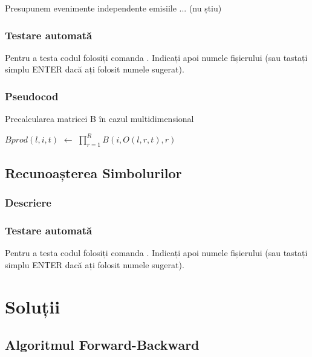 \documentclass[12pt]{article}
\begin{document}
Presupunem evenimente independente emisiile ... (nu știu)

\subsubsection{Testare automată}

Pentru a testa codul folosiți comanda
.  Indicați apoi numele
fișierului (sau tastați simplu ENTER dacă ați folosit numele sugerat).

\subsubsection{Pseudocod}

\begin{algorithm}[H]
  \caption{Precalcularea matricei B în cazul multidimensional}
  \label{alg:alexinmultestematrici}
  \begin{algorithmic}[2]
    \STATE $Bprod(l,i,t)$ $\leftarrow$ $\displaystyle\prod_{r=1}^{R}B(i,O(l,r,t),r)$
    \ENDFOR
    \ENDFOR
    \ENDFOR
  \end{algorithmic} 
\end{algorithm}


\subsection{Recunoașterea Simbolurilor}
\label{sec:symbol-recognition}


\subsubsection{Descriere}


\subsubsection{Testare automată}
\label{sec:testare-ultima}

Pentru a testa codul folosiți comanda .
Indicați apoi numele fișierului (sau tastați simplu ENTER dacă ați
folosit numele sugerat).


\section{Soluții}
\label{sec:solutions}

\subsection{Algoritmul Forward-Backward}
\label{sec:fb-sol}
\end{document}
